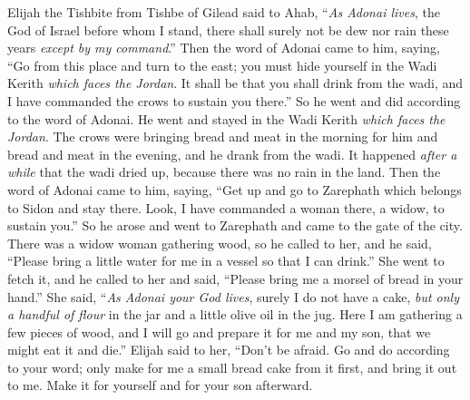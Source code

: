 \begin{biblechapter} %
 Elijah the Tishbite from Tishbe of Gilead said to Ahab, “\textit{As Adonai lives}, the God of Israel before whom I stand, there shall surely not be dew nor rain these years \textit{except by my command}.”
\verse Then the word of Adonai came to him, saying,
\verse “Go from this place and turn to the east; you must hide yourself in the Wadi Kerith \textit{which faces the Jordan}.
\verse It shall be that you shall drink from the wadi, and I have commanded the crows to sustain you there.”
\verse So he went and did according to the word of Adonai. He went and stayed in the Wadi Kerith \textit{which faces the Jordan}.
\verse The crows were bringing bread and meat in the morning for him and bread and meat in the evening, and he drank from the wadi.
\verse It happened \textit{after a while} that the wadi dried up, because there was no rain in the land.
\verse Then the word of Adonai came to him, saying,
\verse “Get up and go to Zarephath which belongs to Sidon and stay there. Look, I have commanded a woman there, a widow, to sustain you.”
\verse So he arose and went to Zarephath and came to the gate of the city. There was a widow woman gathering wood, so he called to her, and he said, “Please bring a little water for me in a vessel so that I can drink.”
\verse She went to fetch it, and he called to her and said, “Please bring me a morsel of bread in your hand.”
\verse She said, “\textit{As Adonai your God lives}, surely I do not have a cake, \textit{but only a handful of flour} in the jar and a little olive oil in the jug. Here I am gathering a few pieces of wood, and I will go and prepare it for me and my son, that we might eat it and die.”
\verse Elijah said to her, “Don’t be afraid. Go and do according to your word; only make for me a small bread cake from it first, and bring it out to me. Make it for yourself and for your son afterward.

\end{biblechapter}
